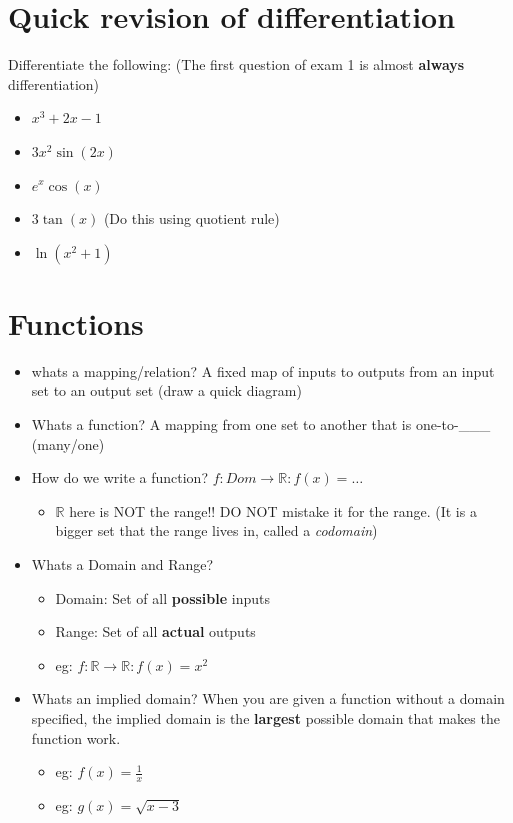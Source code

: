 \documentclass[12pt]{article}
\begin{document}
\section{Quick revision of differentiation }
Differentiate the following: (The first question of exam 1 is almost \textbf{always} differentiation)
\begin{itemize}
    \item $x^{3} + 2x - 1$
    \item $3x^{2}\sin(2x)$
    \item $e^{x}\cos(x)$
    \item $3\tan(x)$ (Do this using quotient rule)
    \item $\ln(x^{2} + 1)$
\end{itemize}

\section{Functions}
\begin{itemize}
    \item whats a mapping/relation? A fixed map of inputs to outputs from an input set to an output set (draw a quick diagram)
    \vspace{3cm}

    \item Whats a function? A mapping from one set to another that is one-to-\_\_\_ (many/one)
    \item How do we write a function? $f: Dom \to \mathbb{R}: f(x) = \dots$
    \begin{itemize}
        \item $\mathbb{R}$ here is NOT the range!! DO NOT mistake it for the range. (It is a bigger set that the range lives in, called a \textit{codomain})
    \end{itemize}
    \item Whats a Domain and Range?
    \begin{itemize}
        \item Domain: Set of all \textbf{possible} inputs
        \item Range: Set of all \textbf{actual} outputs
        \item eg: $f: \mathbb{R} \to \mathbb{R}: f(x) = x^{2}$
    \end{itemize}
    \item Whats an implied domain? When you are given a function without a domain specified, the implied domain is the \textbf{largest} possible domain that makes the function work.
    \begin{itemize}
        \item eg: $f(x) = \frac{1}{x}$
        \item eg: $g(x) = \sqrt{x-3}$
    \end{itemize}
\end{itemize}
\end{document}
